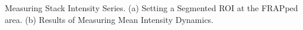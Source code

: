 \label{fig:frapresults} Measuring Stack Intensity Series. (a) Setting a Segmented ROI at the FRAPped area. (b) Results of Measuring Mean Intensity Dynamics.